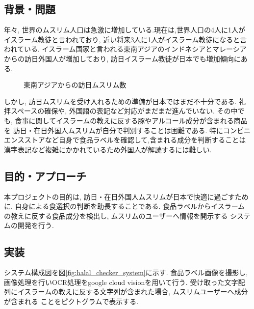 \subsection{背景・問題}
年々, 世界のムスリム人口は急激に増加している.現在は,世界人口の4人に1人がイスラーム教徒と言われており,
近い将来3人に1人がイスラーム教徒になると言われている.
イスラーム国家と言われる東南アジアのインドネシアとマレーシアからの訪日外国人が増加しており,
訪日イスラーム教徒が日本でも増加傾向にある.
\begin{figure}[htbp]
    \begin{center}
    \end{center}
    \caption{東南アジアからの訪日ムスリム数}
    \label{fig:muslimvistor}
\end{figure}
しかし, 訪日ムスリムを受け入れるための準備が日本ではまだ不十分である.
礼拝スペースの確保や, 外国語の表記など対応がまだまだ進んでいない.
その中でも, 食事に関してイスラームの教えに反する豚やアルコール成分が含まれる商品を
訪日・在日外国人ムスリムが自分で判別することは困難である.
特にコンビニエンスストアなど自身で食品ラベルを確認して,含まれる成分を判断することは
漢字表記など複雑にかかれているため外国人が解読するには難しい.

\subsection{目的・アプローチ}
本プロジェクトの目的は, 訪日・在日外国人ムスリムが日本で快適に過ごすために,
自身による食選択の判断を助長することである.
食品ラベルからイスラームの教えに反する食品成分を検出し, ムスリムのユーザーへ情報を開示する
システムの開発を行う.

\subsection{実装}
システム構成図を図\ref{fig:halal_checker_system}に示す.
食品ラベル画像を撮影し, 画像処理を行いOCR処理をgoogle cloud visionを用いて行う.
受け取った文字配列にイスラームの教えに反する文字列が含まれた場合, ムスリムユーザーへ成分が含まれる
ことをピクトグラムで表示する.

